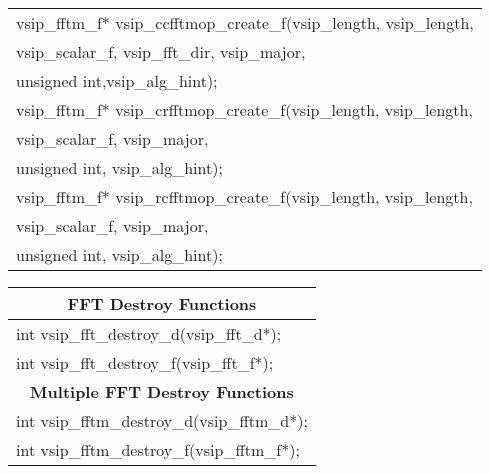 {\begin{tabular}[H]{|l|}
vsip\_fftm\_f* vsip\_ccfftmop\_create\_f(vsip\_length, vsip\_length,\\*\hspace{.7cm}vsip\_scalar\_f, vsip\_fft\_dir, vsip\_major,\\*\hspace{.7cm} unsigned int,vsip\_alg\_hint);\\
vsip\_fftm\_f* vsip\_crfftmop\_create\_f(vsip\_length, vsip\_length,\\*\hspace{.7cm}vsip\_scalar\_f, vsip\_major,\\*\hspace{.7cm} unsigned int, vsip\_alg\_hint);\\
vsip\_fftm\_f* vsip\_rcfftmop\_create\_f(vsip\_length, vsip\_length,\\*\hspace{.7cm}vsip\_scalar\_f, vsip\_major,\\*\hspace{.7cm} unsigned int, vsip\_alg\_hint);\\ \hline
\end{tabular}
}
\clearpage
\hspace*{1.cm} {
\ttfamily
\begin{tabular}[H]{|l|}
\multicolumn{1}{c}{\rmfamily \bfseries FFT Destroy Functions}\\ \hline
int vsip\_fft\_destroy\_d(vsip\_fft\_d*);\\
int vsip\_fft\_destroy\_f(vsip\_fft\_f*);\\
\multicolumn{1}{c}{\rmfamily \bfseries Multiple FFT Destroy Functions}\\ \hline
int vsip\_fftm\_destroy\_d(vsip\_fftm\_d*);\\
int vsip\_fftm\_destroy\_f(vsip\_fftm\_f*);\\ \hline
\end{tabular}
}\vspace{.1cm}
